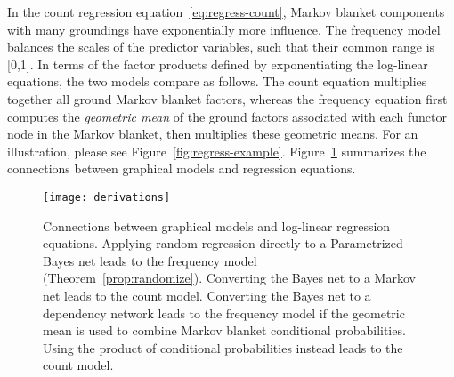 \documentclass[twoside,leqno,twocolumn]{article}
\begin{document}
In the count regression equation~\eqref{eq:regress-count}, Markov blanket components with many groundings have exponentially more influence. 
The frequency model balances the scales of the predictor variables, such that their common range is [0,1]. In terms of the factor products defined by exponentiating the log-linear equations, the two models compare as follows. The count equation multiplies together all ground Markov blanket factors, whereas the frequency equation first computes the {\em geometric mean} of the ground factors associated with each functor node in the Markov blanket, then multiplies these geometric means. For an illustration, please see Figure~\ref{fig:regress-example}. 
Figure~\ref{fig:derivations} summarizes the connections between graphical models and regression equations. 

\begin{figure}[htbp]
\begin{center}
\texttt{[image: derivations]}
\caption{Connections between graphical models and log-linear regression equations. Applying random regression directly to a Parametrized Bayes net leads to the frequency model (Theorem~\ref{prop:randomize}). Converting the Bayes net to a Markov net leads to the count model. Converting the Bayes net to a dependency network leads to the frequency model if the geometric mean is used to combine Markov blanket conditional probabilities. Using the product of conditional probabilities instead leads to the count model. 
\label{fig:derivations}}
\end{center}
\end{figure}



\end{document}
